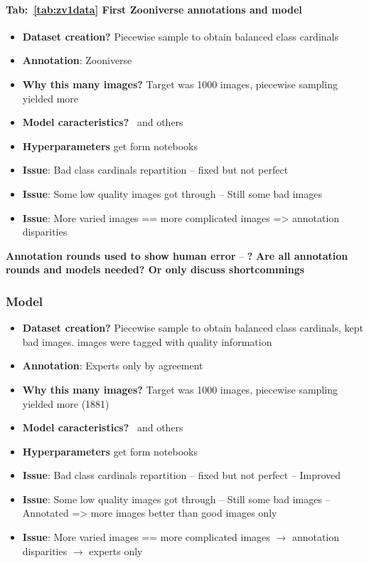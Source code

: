 \documentclass[english]{article}
\begin{document}
\paragraph{Tab:~\ref{tab:zv1data} First Zooniverse annotations and model}
\begin{itemize}
	\item \textbf{Dataset creation?} Piecewise sample to obtain balanced class cardinals
	\item \textbf{Annotation}: Zooniverse
	\item \textbf{Why this many images?} Target was 1000 images, piecewise sampling yielded more
	\item \textbf{Model caracteristics?}~\parencite{dosovitskiyImageWorth16x162021} and others
	\item \textbf{Hyperparameters} get form notebooks
	\item \textbf{Issue}: Bad class cardinals repartition -- fixed but not perfect
	\item \textbf{Issue}: Some low quality images got through -- Still some bad images
	\item \textbf{Issue}: More varied images == more complicated images => annotation disparities
\end{itemize}

\textbf{Annotation rounds used to show human error} -- \textbf{?}
\textbf{Are all annotation rounds and models needed? Or only discuss shortcommings}

\subsubsection{Model}


\begin{itemize}
	\item \textbf{Dataset creation?} Piecewise sample to obtain balanced class cardinals, kept bad images. images were tagged with quality information
	\item \textbf{Annotation}: Experts only by agreement
	\item \textbf{Why this many images?} Target was 1000 images, piecewise sampling yielded more (1881)
	\item \textbf{Model caracteristics?}~\parencite{dosovitskiyImageWorth16x162021} and others
	\item \textbf{Hyperparameters} get form notebooks
	\item \textbf{Issue}: Bad class cardinals repartition -- fixed but not perfect -- Improved
	\item \textbf{Issue}: Some low quality images got through -- Still some bad images -- Annotated => more images better than good images only
	\item \textbf{Issue}: More varied images == more complicated images $\rightarrow$ annotation disparities $\rightarrow$ experts only
\end{itemize}
\end{document}
